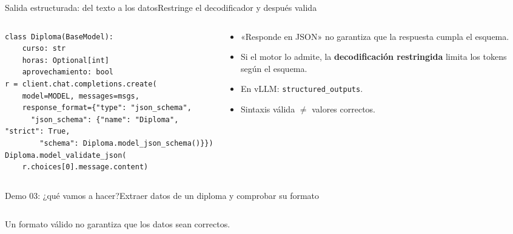 \begin{frame}[fragile]{Salida estructurada: del texto a los datos}{Restringe el decodificador y después valida}
	\begin{columns}[T]
		\begin{column}{0.56\textwidth}
			\begin{lstlisting}
class Diploma(BaseModel):
    curso: str
    horas: Optional[int]
    aprovechamiento: bool
r = client.chat.completions.create(
    model=MODEL, messages=msgs,
    response_format={"type": "json_schema",
      "json_schema": {"name": "Diploma", "strict": True,
        "schema": Diploma.model_json_schema()}})
Diploma.model_validate_json(
    r.choices[0].message.content)
\end{lstlisting}
		\end{column}
		\begin{column}{0.42\textwidth}
			\footnotesize
			\begin{itemize}
				\item «Responde en JSON» no garantiza que la respuesta cumpla el esquema.
				\item Si el motor lo admite, la \textbf{decodificación restringida} limita los tokens según el esquema.
				\item En vLLM: \texttt{structured\_outputs}.
				\item Sintaxis válida $\neq$ valores correctos.
			\end{itemize}
		\end{column}
	\end{columns}
\end{frame}

\begin{frame}{Demo 03: ¿qué vamos a hacer?}{Extraer datos de un diploma y comprobar su formato}
	\begin{columns}[T]
		\begin{column}{0.31\textwidth}
		\end{column}
		\begin{column}{0.31\textwidth}
		\end{column}
		\begin{column}{0.31\textwidth}
		\end{column}
	\end{columns}
	{\footnotesize Un formato válido no garantiza que los datos sean correctos.}
\end{frame}

